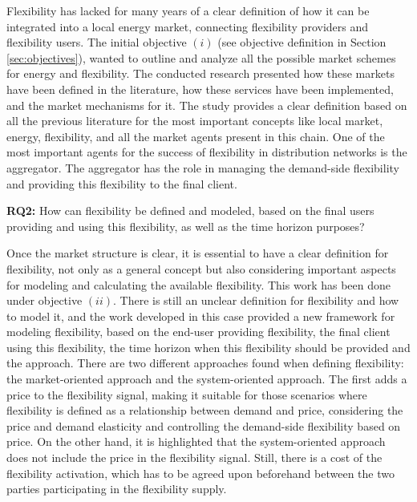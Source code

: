 Flexibility has lacked for many years of a clear definition of how it can be integrated into a local energy market, connecting flexibility providers and flexibility users. The initial objective $(i)$ (see objective definition in Section \ref{sec:objectives}), wanted to outline and analyze all the possible market schemes for energy and flexibility. The conducted research presented how these markets have been defined in the literature, how these services have been implemented, and the market mechanisms for it. The study provides a clear definition based on all the previous literature for the most important concepts like local market, energy, flexibility, and all the market agents present in this chain. One of the most important agents for the success of flexibility in distribution networks is the aggregator. The aggregator has the role in managing the demand-side flexibility and providing this flexibility to the final client.

\begin{tcolorbox}

\textbf{RQ2:} How can flexibility be defined and modeled, based on the final users providing and using this flexibility, as well as the time horizon purposes? 

\end{tcolorbox}
Once the market structure is clear, it is essential to have a clear definition for flexibility, not only as a general concept but also considering important aspects for modeling and calculating the available flexibility. This work has been done under objective $(ii)$. There is still an unclear definition for flexibility and how to model it, and the work developed in this case provided a new framework for modeling flexibility, based on the end-user providing flexibility, the final client using this flexibility, the time horizon when this flexibility should be provided and the approach. There are two different approaches found when defining flexibility: the market-oriented approach and the system-oriented approach. The first adds a price to the flexibility signal, making it suitable for those scenarios where flexibility is defined as a relationship between demand and price, considering the price and demand elasticity and controlling the demand-side flexibility based on price. On the other hand, it is highlighted that the system-oriented approach does not include the price in the flexibility signal. Still, there is a cost of the flexibility activation, which has to be agreed upon beforehand between the two parties participating in the flexibility supply. 

